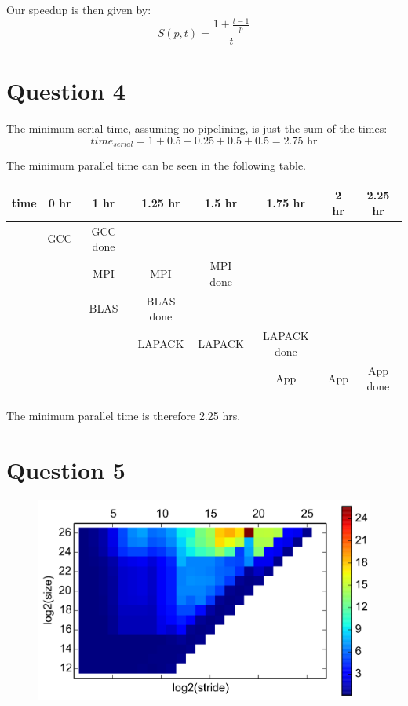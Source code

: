 \documentclass[11pt]{article}
\begin{document}
        Our speedup is then given by:
        \begin{equation*}
            S(p ,t) = \frac{1 + \frac{t - 1}{p}}{t}
        \end{equation*}

    \section*{Question 4}
        The minimum serial time, assuming no pipelining, is just the sum of the times:
        \begin{equation*}
            time_{serial} = 1 + 0.5 + 0.25 + 0.5 + 0.5 = 2.75 \text{ hr}
        \end{equation*}

        The minimum parallel time can be seen in the following table.
        \begin{table}[H]
            \centering
            \begin{tabular}{| c | c | c | c | c | c | c | c | }
            \hline
            time & 0 hr & 1 hr & 1.25 hr & 1.5 hr & 1.75 hr & 2 hr & 2.25 hr \\
            \hline \hline
                 & GCC  & GCC done & & & & & \\
            \hline
                 &      & MPI & MPI & MPI done & & &  \\
            \hline
                 &      & BLAS & BLAS done & & & & \\
            \hline
                 &      &          & LAPACK & LAPACK & LAPACK done  & & \\
            \hline
                 &      &          &        &        & App & App & App done\\
            \hline
            \end{tabular}
        \end{table}

        The minimum parallel time is therefore 2.25 hrs.

    \section*{Question 5}
        \begin{figure}[H]
            \centering
            \includegraphics[width=5in]{timings/timings-heat.png}
        \end{figure}
\end{document}
